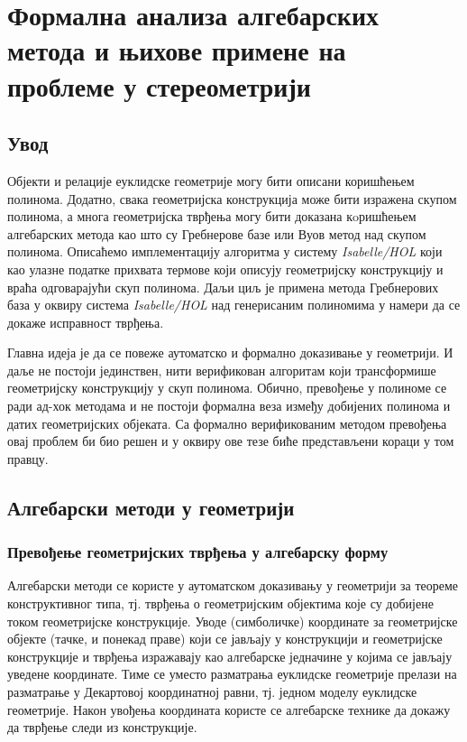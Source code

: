 \chapter[Aлгeбарски методи и стереометрија]{Формална анализа алгебарских метода и њихове примене на проблеме у стереометрији}
\label{chapter::algMetodi}

\section{Увод}

Објекти и релације еуклидске геометрије могу бити описани коришћењем
полинома. Додатно, свака геометријска конструкција може бити изражена
скупом полинома, а многа геометријска тврђења могу бити доказана
кoришћењем алгебарских метода као што су Гребнерове базе или Вуов
метод над скупом полинома. Описаћемо имплементацију алгоритма у
систему \emph{Isabelle/HOL} који као улазне податке прихвата термове
који описују геометријску конструкцију и враћа одговарајући скуп
полинома. Даљи циљ је примена метода Гребнерових база у оквиру система
\emph{Isabelle/HOL} над генерисаним полиномима у намери да се докаже
исправност тврђења.

Главна идеја је да се повеже аутоматско и формално доказивање у
геометрији. И даље не постоји јединствен, нити верификован алгоритам
који трансформише геометријску конструкцију у скуп полинома. Обично,
превођење у полиноме се ради ад-хок методама и не постоји формална
веза између добијених полинома и датих геометријских објеката. Са
формално верификованим методом превођења овај проблем би био решен и
у оквиру ове тезе биће представљени кораци у том правцу.

\section{Алгебарски методи у геометрији}

\subsection{Превођење геометријских тврђења у алгебарску форму}

Алгебарски методи се користе у аутоматском доказивању у геометрији за
теореме конструктивног типа, тј. тврђења о геометријским објектима
које су добијене током геометријске конструкције. Уводе (симболичке)
координате за геометријске објекте (тачке, и понекад праве) који се
јављају у конструкцији и геометријске конструкције и тврђења
изражавају као алгебарске једначине у којима се јављају уведене
координате. Тиме се уместо разматрања еуклидске геометрије прелази на
разматрање у Декартовој координатној равни, тј. једном моделу
еуклидске геометрије. Након увођења координата користе се алгебарске
технике да докажу да тврђење следи из конструкције.

